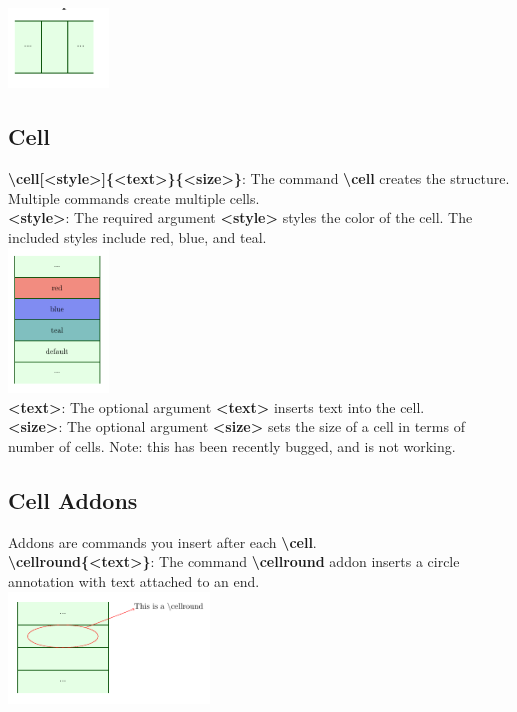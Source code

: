 \documentclass[a4paper]{article}
\begin{document}
\includegraphics[width=0.2\textwidth]{stack_vert.png}\\

\subsection{Cell}

\textbf{\textbackslash cell[\textless style\textgreater]\{\textless text\textgreater\}\{\textless size\textgreater\}}: The command \textbf{\textbackslash cell} creates the structure. Multiple commands create multiple cells.\vspace{3mm}\\
\textbf{\textless style\textgreater}: The required argument \textbf{\textless style\textgreater} styles the color of the cell. The included styles include red, blue, and teal.\vspace{3mm}\\
\includegraphics[width=0.2\textwidth]{stack_style.png}\\
\textbf{\textless text\textgreater}: The optional argument \textbf{\textless text\textgreater} inserts text into the cell.
\vspace{3mm}\\
\textbf{\textless size\textgreater}: The optional argument \textbf{\textless size\textgreater} sets the size of a cell in terms of number of cells. Note: this has been recently bugged, and is not working.
\subsection{Cell Addons}
Addons are commands you insert after each \textbf{\textbackslash cell}.\vspace{3mm}\\
\textbf{\textbackslash cellround\{\textless text\textgreater\}}: The command \textbf{\textbackslash cellround} addon inserts a circle annotation with text attached to an end.
\vspace{3mm}\\
\includegraphics[width=0.4\textwidth]{stack_round.png}\\
\end{document}
